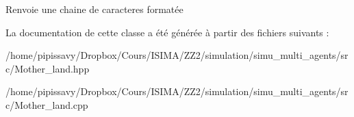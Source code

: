 \begin{DoxyReturn}{Renvoie}
une chaine de caracteres formatée 
\end{DoxyReturn}


La documentation de cette classe a été générée à partir des fichiers suivants \-:\begin{DoxyCompactItemize}
\item 
/home/pipissavy/\-Dropbox/\-Cours/\-I\-S\-I\-M\-A/\-Z\-Z2/simulation/simu\-\_\-multi\-\_\-agents/src/Mother\-\_\-land.\-hpp\item 
/home/pipissavy/\-Dropbox/\-Cours/\-I\-S\-I\-M\-A/\-Z\-Z2/simulation/simu\-\_\-multi\-\_\-agents/src/Mother\-\_\-land.\-cpp\end{DoxyCompactItemize}
